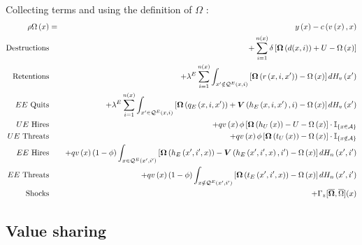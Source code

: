 Collecting terms and using the definition of $\Omega$ :
{\small
\begin{eqnarray*}
\rho \Omega \left( x\right) &=&y\left( x\right) -c\left( v\left( x\right)
,x\right) \\
\text{Destructions} &&+\sum\limits_{i=1}^{n\left( x\right) }\delta \left[
\boldsymbol{\Omega}\left( d(x,i)\right) +U -\Omega \left( x\right) \right] \\
\text{Retentions} &&+\lambda ^{E}\sum\limits_{i=1}^{n\left( x\right)
}\int_{x^{\prime }\notin \mathcal{Q}^{E}\left( x,i\right) }\left[ \boldsymbol{%
\Omega}\left( r\left( x,i,x^{\prime }\right) \right) -\Omega \left( x\right) %
\right] dH_v\left( x^{\prime }\right) \\
\text{$EE$ Quits} &&+\lambda ^{E}\sum\limits_{i=1}^{n\left( x\right)
}\int_{x^{\prime }\in \mathcal{Q}^{E}\left( x,i\right) }\left[ \boldsymbol{\Omega%
}\left( q_{E}\left( x,i,x^{\prime }\right) \right) +\boldsymbol{V}\left(
h_{E}\left( x,i,x^{\prime }\right) ,i\right) -\Omega \left( x\right) \right]
dH_v\left( x^{\prime }\right) \\
\text{$UE$ Hires} &&+qv\left( x\right) \phi \left[ \boldsymbol{\Omega}\left(
h_{U}\left( x\right) \right) - U -\Omega \left( x\right) \right] \cdot
\mathbb{I}_{\left\{ x\in \mathcal{A}\right\} } \\
\text{$UE$ Threats} &&+qv\left( x\right) \phi \left[ \boldsymbol{\Omega}\left(
t_{U}\left( x\right) \right) -\Omega \left( x\right) \right] \cdot \mathbb{I}%
_{\left\{ x\notin \mathcal{A}\right\} } \\
\text{$EE$ Hires} &&+qv\left( x\right) \left( 1-\phi \right) \int_{x\in
\mathcal{Q}^{E}\left( x^{\prime },i^{\prime }\right) }\left[ \boldsymbol{\Omega}%
\left( h_{E}\left( x^{\prime },i^{\prime },x\right) \right) -\boldsymbol{V}%
\left( h_{E}\left( x^{\prime },i^{\prime },x\right) ,i^{\prime}\right)
-\Omega \left( x\right) \right] dH_n\left( x^{\prime },i^{\prime }\right) \\
\text{$EE$ Threats} &&+qv\left( x\right) \left( 1-\phi \right) \int_{x\notin
\mathcal{Q}^{E}\left( x^{\prime },i^{\prime }\right) }\left[ \boldsymbol{\Omega}%
\left( t_{E}\left( x^{\prime },i^{\prime },x\right) \right) -\Omega \left(
x\right) \right] dH_n\left( x^{\prime },i^{\prime }\right) \\
\text{Shocks} &&+\Gamma_z[\boldsymbol{\overline{\Omega}},\overline{\Omega}](x)
\end{eqnarray*}
}


\subsection{Value sharing}

